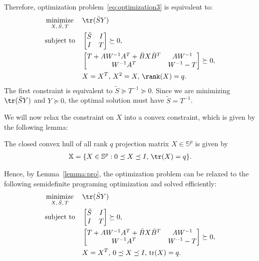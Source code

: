   Therefore, optimization problem~\eqref{eq:optimization3} is equivalent to:
  \begin{align}
    &\mathop{\textrm{minimize}}\limits_{X,\,\tilde S,\,T}&
    & \tr(\tilde SY) \label{eq:optimization4}\\
    &\textrm{subject to}&
    &\begin{bmatrix}
      \tilde S&I\\
      I&T
    \end{bmatrix}\succeq 0, \nonumber\\
    &&
    &\begin{bmatrix}
      T+AW^{-1}A^T+\bar BX\bar B^T & AW^{-1}\\
      W^{-1}A^T & W^{-1} - T
    \end{bmatrix} \succeq 0 ,\nonumber\\
    &&
    &X = X^T,\,X^2 = X,\,\rank(X) = q.\nonumber
  \end{align}
  The first constraint is equivalent to $\tilde S\succeq T^{-1}\succeq 0$. Since we are minimizing $\tr(\tilde SY)$ and $Y\succeq 0$, the optimal solution must have $\tilde S = T^{-1}$.

  We will now relax the constraint on $X$ into a convex constraint, which is given by the following lemma:
  \begin{lemma}\label{lemma:pro}
    The closed convex hull of all rank $q$ projection matrix $X\in \mathbb S^p$ is given by
    \begin{align*}
      \mathbb X = \{X\in \mathbb S^p: 0\preceq X\preceq I,\, \tr(X) = q\} .
    \end{align*}
  \end{lemma}
%
  Hence, by Lemma~\ref{lemma:pro}, the optimization problem can be relaxed to the following semidefinite programing optimization and solved efficiently:
  \begin{align}
    &\mathop{\textrm{minimize}}\limits_{X,\,\tilde S,\,T}&
    & \tr(\tilde SY) \label{eq:optimization5}\\
    &\textrm{subject to}&
    &\begin{bmatrix}
      \tilde S&I\\
      I&T
    \end{bmatrix}\succeq 0, \nonumber\\
    &&
    &\begin{bmatrix}
      T+AW^{-1}A^T+\bar BX\bar B^T & AW^{-1}\\
      W^{-1}A^T & W^{-1} - T
    \end{bmatrix} \succeq 0 ,\nonumber\\
    &&
    &X = X^T,\,0\preceq X\preceq I,\,\text{tr}(X) = q.\nonumber
  \end{align}

